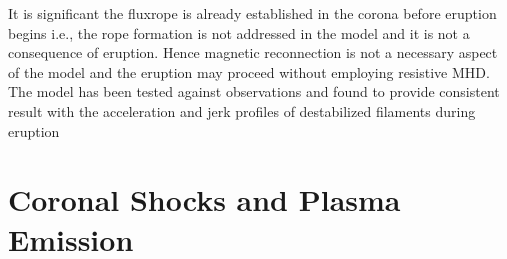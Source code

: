It is significant the fluxrope is already established in the corona before eruption begins i.e., the rope formation is not addressed in the model and it is not a consequence of eruption. Hence magnetic reconnection is not a necessary aspect of the model and the eruption may proceed without employing resistive MHD. The model has been tested against observations and found to provide consistent result with the acceleration and jerk profiles of destabilized filaments during eruption \citep{schrijver2008}

\section{Coronal Shocks and Plasma Emission}\label{sec:3}

